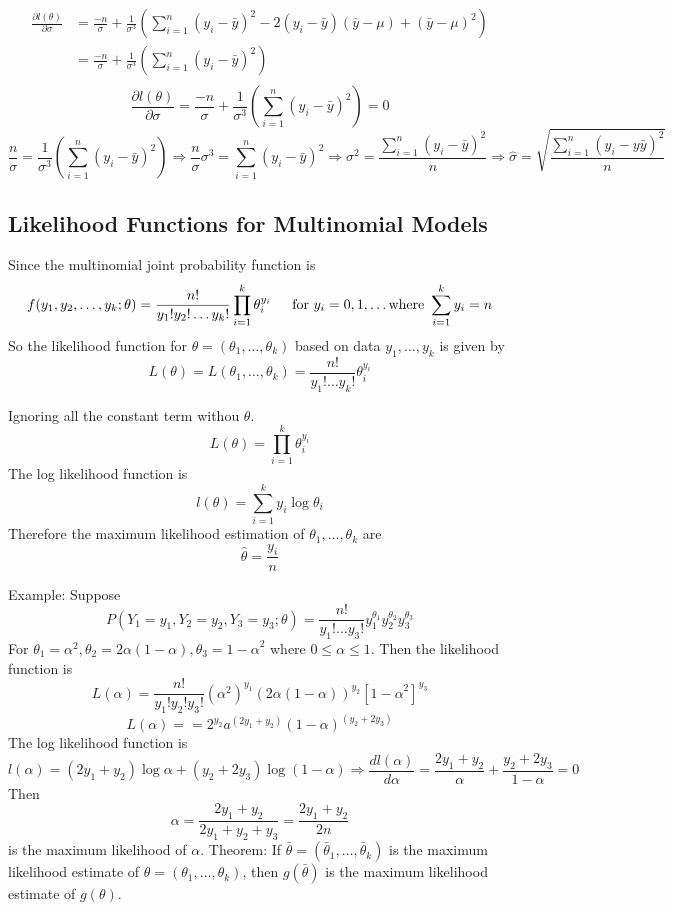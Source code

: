 \documentclass{article}
\newcommand{\sqr}[1]{{#1}^2}
\begin{document}
\begin{align*}
    \frac{\partial l(\theta)}{\partial \sigma} &= \frac{-n}{\sigma} + \frac{1}{\sigma ^3}\left(\sum_{i=1}^{n}\sqr{(y_i - \bar{y})} - 2(y_i - \bar{y})(\bar{y} - \mu) + \sqr{(\bar{y} - \mu)}\right) \\
    &= \frac{-n}{\sigma} + \frac{1}{\sigma^3}(\sum_{i=1}^{n}\sqr{(y_i - \bar{y})})\\
\end{align*}
\[
\frac{\partial l(\theta)}{\partial \sigma} = \frac{-n}{\sigma} + \frac{1}{\sigma^3}(\sum_{i=1}^{n}\sqr{(y_i - \bar{y})}) = 0
\]
$$\frac{n}{\sigma} = \frac{1}{\sigma^3}\left(\sum_{i=1}^{n}\sqr{(y_i - \bar{y})}\right) \Rightarrow \frac{n}{\sigma} \sigma^3 = \sum_{i=1}^{n}\sqr{(y_i -\bar{y})} \Rightarrow \sqr{\sigma} = \frac{\sum_{i=1}^{n}\sqr{(y_i - \bar{y})}}{n}\Rightarrow \hat{\sigma} = \sqrt{\frac{\sum_{i=1}^{n}\sqr{(y_i - y\bar{y})}}{n}}$$

\subsection{Likelihood Functions for Multinomial Models}
Since the multinomial joint probability function is
\[
f(y_1, y_2, \dotsc, y_k;\theta) = \frac{n!}{y_1!y_2!\dotsc y_k!}\prod_{i=1}^{k}\theta_i^{y_i} \indent \text{for } y_i = 0, 1, \dotsc \text{where }\sum_{i=1}^{k}y_i = n
\]
So the likelihood function for $\theta = (\theta_1, \dotsc, \theta_k)$ based on data $y_1, \dotsc, y_k$ is given by
\[
L(\theta) = L(\theta_1, \dotsc, \theta_k) = \frac{n!}{y_1! \dotsc y_k!}\theta_i^{y_i}
\]

\noindent Ignoring all the constant term withou $\theta$.
\[
L(\theta) = \prod_{i=1}^{k}\theta_i^{y_i}
\]
The log likelihood function is
\[
l(\theta) =\sum_{i=1}^{k}y_i \log\theta_i
\]
Therefore the maximum likelihood estimation of $\theta_1, \dotsc, \theta_k$ are
\[
\hat{\theta} = \frac{y_i}{n}
\]

\noindent Example: Suppose 
\[
P(Y_1 = y_1, Y_2 = y_2, Y_3 = y_3;\theta) =\frac{n!}{y_1!\dotsc y_3!}y_1^{\theta_1}y_2^{\theta_2}y_3^{\theta_3}
\]
For $\theta_1  = \sqr{\alpha}, \theta_2 = 2\alpha(1-\alpha), \theta_3 = \sqr{1-\alpha}$ where $0\le \alpha \le 1$.
Then the likelihood function is
\[
L(\alpha) = \frac{n!}{y_1!y_2!y_3!}(\sqr{\alpha})^{y_1}(2\alpha(1-\alpha))^{y_2}\left[\sqr{1-\alpha}\right]^{y_3}
\]
\[
L(\alpha) = = 2^{y_2}a^(2y_1 + y_2)(1-\alpha)^(y_2 + 2y_3)
\]
The log likelihood function is
\[
l(\alpha) = (2y_1 + y_2)\log\alpha + (y_2 + 2y_3)\log(1-\alpha) \Rightarrow \frac{dl(\alpha)}{d\alpha} = \frac{2y_1 + y_2}{\alpha} + \frac{y_2 + 2y_3}{1-\alpha} =0
\] 
Then 
\[
\alpha = \frac{2y_1 + y_2}{2y_1 + y_2 + y_3} = \frac{2y_1 + y_2}{2n}
\]
is the maximum likelihood of $\alpha$.
\newpage
\noindent Theorem: If $\bar{\theta} = \left(\bar{\theta}_1, \dotsc, \bar{\theta}_k\right)$ is the maximum likelihood estimate of $\theta = \left(\theta_1, \dotsc, \theta_k\right)$, then $g(\bar{\theta})$ is the maximum likelihood estimate of $g(\theta)$.
\end{document}
